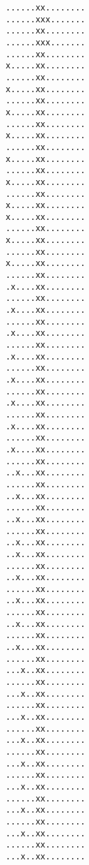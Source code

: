 {%
\fontsize{3}{0}%
\selectfont%
\begin{verbatim}......xx........
......xxx.......
......xx........
......xxx.......
......xx........
x.....xx........
......xx........
x.....xx........
......xx........
x.....xx........
......xx........
x.....xx........
......xx........
x.....xx........
......xx........
x.....xx........
......xx........
x.....xx........
x.....xx........
......xx........
x.....xx........
......xx........
x.....xx........
......xx........
.x....xx........
......xx........
.x....xx........
......xx........
.x....xx........
......xx........
.x....xx........
......xx........
.x....xx........
......xx........
.x....xx........
......xx........
.x....xx........
......xx........
.x....xx........
......xx........
..x...xx........
......xx........
..x...xx........
......xx........
..x...xx........
......xx........
..x...xx........
..x...xx........
......xx........
..x...xx........
......xx........
..x...xx........
......xx........
..x...xx........
......xx........
..x...xx........
......xx........
...x..xx........
......xx........
...x..xx........
......xx........
...x..xx........
......xx........
...x..xx........
......xx........
...x..xx........
......xx........
...x..xx........
......xx........
...x..xx........
......xx........
...x..xx........
......xx........
...x..xx........\end{verbatim}
}

